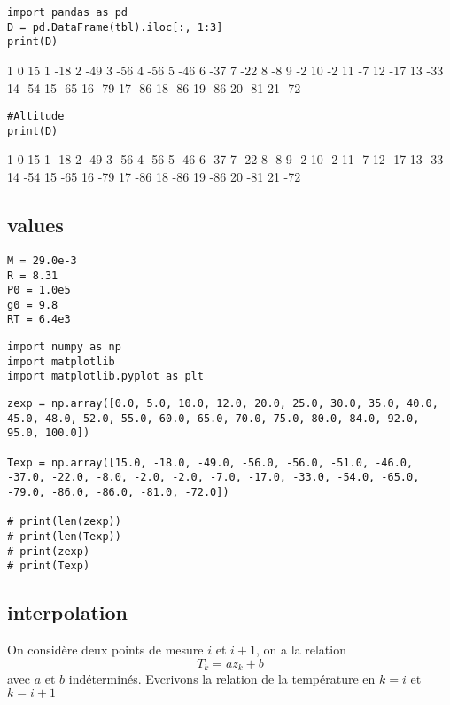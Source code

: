 \documentclass[11pt]{article}
\begin{document}
\begin{verbatim}
import pandas as pd
D = pd.DataFrame(tbl).iloc[:, 1:3]
print(D)
\end{verbatim}

     1
0   15
1  -18
2  -49
3  -56
4  -56
5  -46
6  -37
7  -22
8   -8
9   -2
10  -2
11  -7
12 -17
13 -33
14 -54
15 -65
16 -79
17 -86
18 -86
19 -86
20 -81
21 -72


\begin{verbatim}
#Altitude
print(D)
\end{verbatim}

     1
0   15
1  -18
2  -49
3  -56
4  -56
5  -46
6  -37
7  -22
8   -8
9   -2
10  -2
11  -7
12 -17
13 -33
14 -54
15 -65
16 -79
17 -86
18 -86
19 -86
20 -81
21 -72


\subsection{values}
\label{sec:org7030535}
\begin{verbatim}
M = 29.0e-3
R = 8.31
P0 = 1.0e5
g0 = 9.8
RT = 6.4e3
\end{verbatim}

\begin{verbatim}
import numpy as np
import matplotlib
import matplotlib.pyplot as plt
\end{verbatim}

\begin{verbatim}
zexp = np.array([0.0, 5.0, 10.0, 12.0, 20.0, 25.0, 30.0, 35.0, 40.0, 45.0, 48.0, 52.0, 55.0, 60.0, 65.0, 70.0, 75.0, 80.0, 84.0, 92.0, 95.0, 100.0])

Texp = np.array([15.0, -18.0, -49.0, -56.0, -56.0, -51.0, -46.0, -37.0, -22.0, -8.0, -2.0, -2.0, -7.0, -17.0, -33.0, -54.0, -65.0, -79.0, -86.0, -86.0, -81.0, -72.0])

# print(len(zexp))
# print(len(Texp))
# print(zexp)
# print(Texp)
\end{verbatim}


\subsection{interpolation}
\label{sec:org7720918}
On considère deux points de mesure \(i\) et \(i+1\), on a la relation $$T_k = a z_k +b $$ avec \(a\) et \(b\) indéterminés. Evcrivons la relation de la température en \(k=i\) et \(k=i+1\)
\end{document}
